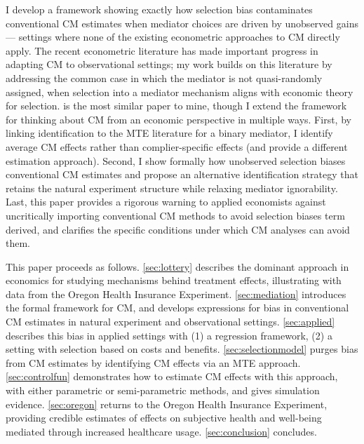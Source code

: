 I develop a framework showing exactly how selection bias contaminates conventional CM estimates when mediator choices are driven by unobserved gains --- settings where none of the existing econometric approaches to CM directly apply.
The recent econometric literature has made important progress in adapting CM to observational settings;
my work builds on this literature by addressing the common case in which the mediator is not quasi-randomly assigned, when selection into a mediator mechanism aligns with economic theory for selection.
\cite{frolich2017direct} is the most similar paper to mine, though I extend the framework for thinking about CM from an economic perspective in multiple ways.
First, by linking identification to the MTE literature for a binary mediator, I identify average CM effects rather than complier-specific effects (and provide a different estimation approach).
Second, I show formally how unobserved selection biases conventional CM estimates and propose an alternative identification strategy that retains the natural experiment structure while relaxing mediator ignorability.
Last, this paper provides a rigorous warning to applied economists against uncritically importing conventional CM methods to avoid selection biases term derived, and clarifies the specific conditions under which CM analyses can avoid them.

This paper proceeds as follows.
\autoref{sec:lottery} describes the dominant approach in economics for studying mechanisms behind treatment effects, illustrating with data from the Oregon Health Insurance Experiment.
\autoref{sec:mediation} introduces the formal framework for CM, and develops expressions for bias in conventional CM estimates in natural experiment and observational settings.
\autoref{sec:applied} describes this bias in applied settings with (1) a regression framework, (2) a setting with selection based on costs and benefits.
\autoref{sec:selectionmodel} purges bias from CM estimates by identifying CM effects via an MTE approach.
\autoref{sec:controlfun} demonstrates how to estimate CM effects with this approach, with either parametric or semi-parametric methods, and gives simulation evidence.
\autoref{sec:oregon} returns to the Oregon Health Insurance Experiment, providing credible estimates of effects on subjective health and well-being mediated through increased healthcare usage.
\autoref{sec:conclusion} concludes.
